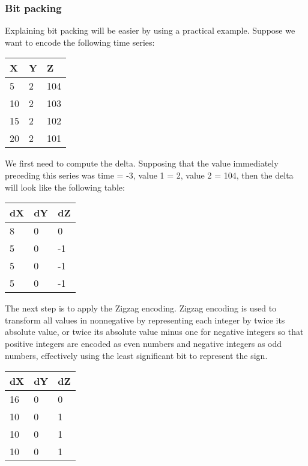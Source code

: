 \subsubsection{Bit packing}
Explaining bit packing will be easier by using a practical example. Suppose we want to encode
the following time series:
\begin{table}[!htbp]
\centering
\begin{tabular}{l|l|l}
\textbf{X} & \textbf{Y} & \textbf{Z} \\ 
\hline
5  & 2 & 104 \\
10 & 2 & 103 \\
15 & 2 & 102 \\
20 & 2 & 101 \\
\end{tabular}
\end{table}

We first need to compute the delta. Supposing that the value immediately preceding
this series was time = -3, value 1 = 2, value 2 = 104, then the delta will look like the
following table:
\begin{table}[!htbp]
\centering
\begin{tabular}{l|l|l}
\textbf{dX} & \textbf{dY} & \textbf{dZ} \\ 
\hline
8 & 0 &  0 \\
5 & 0 & -1 \\
5 & 0 & -1 \\
5 & 0 & -1 \\
\end{tabular}
\end{table}

The next step is to apply the Zigzag encoding. Zigzag encoding is used to transform all
values in nonnegative by representing each integer by twice its absolute value, or twice
its absolute value minus one for negative integers so that positive integers are encoded
as even numbers and negative integers as odd numbers, effectively using the least significant
bit to represent the sign.
\begin{table}[!htbp]
\centering
\begin{tabular}{l|l|l}
\textbf{dX} & \textbf{dY} & \textbf{dZ} \\ 
\hline
16 & 0 &  0 \\
10 & 0 &  1 \\
10 & 0 &  1 \\
10 & 0 &  1 \\
\end{tabular}
\end{table}

